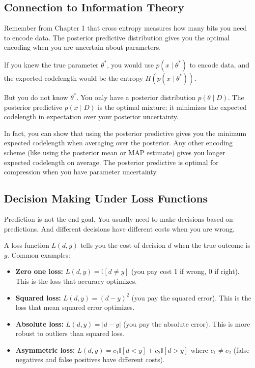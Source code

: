 \vspace{1.5em}

\subsection{Connection to Information Theory}

Remember from Chapter 1 that cross entropy measures how many bits you need to encode data. The posterior predictive distribution gives you the optimal encoding when you are uncertain about parameters.

If you knew the true parameter $\theta^*$, you would use $p(x \mid \theta^*)$ to encode data, and the expected codelength would be the entropy $H(p(x \mid \theta^*))$.

But you do not know $\theta^*$. You only have a posterior distribution $p(\theta \mid D)$. The posterior predictive $p(x \mid D)$ is the optimal mixture: it minimizes the expected codelength in expectation over your posterior uncertainty.

In fact, you can show that using the posterior predictive gives you the minimum expected codelength when averaging over the posterior. Any other encoding scheme (like using the posterior mean or MAP estimate) gives you longer expected codelength on average. The posterior predictive is optimal for compression when you have parameter uncertainty.

\subsection{Decision Making Under Loss Functions}

Prediction is not the end goal. You usually need to make decisions based on predictions. And different decisions have different costs when you are wrong.

A loss function $L(d, y)$ tells you the cost of decision $d$ when the true outcome is $y$. Common examples:

\begin{itemize}
\item \textbf{Zero one loss:} $L(d, y) = \mathbb{I}[d \neq y]$ (you pay cost 1 if wrong, 0 if right). This is the loss that accuracy optimizes.

\item \textbf{Squared loss:} $L(d, y) = (d - y)^2$ (you pay the squared error). This is the loss that mean squared error optimizes.

\item \textbf{Absolute loss:} $L(d, y) = |d - y|$ (you pay the absolute error). This is more robust to outliers than squared loss.

\item \textbf{Asymmetric loss:} $L(d, y) = c_1 \mathbb{I}[d < y] + c_2 \mathbb{I}[d > y]$ where $c_1 \neq c_2$ (false negatives and false positives have different costs).
\end{itemize}

